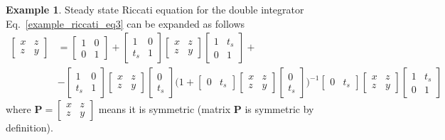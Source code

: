 \documentclass[11pt,a4paper,oneside]{book}
\numberwithin{equation}{section}
\theoremstyle{it}
\theoremstyle{definition}
\newtheorem{example}{Example}[chapter]
\begin{document}
\begin{example}{Steady state Riccati equation for the double integrator}
Eq.~\eqref{example_riccati_eq3} can be expanded as follows
\begin{equation}\label{example_riccati_eq4}
	\begin{aligned}
		\begin{bmatrix}x&z\\z&y\end{bmatrix} &=\begin{bmatrix}1&0\\0&1\end{bmatrix} + 
		\begin{bmatrix}1&0\\t_s&1\end{bmatrix}\begin{bmatrix}x&z\\z&y\end{bmatrix}\begin{bmatrix}1&t_s\\0&1\end{bmatrix}+ \\[6pt]
		&-\begin{bmatrix}1&0\\t_s&1\end{bmatrix}\begin{bmatrix}x&z\\z&y\end{bmatrix}\begin{bmatrix}0\\t_s\end{bmatrix}
		\Bigg(1+\begin{bmatrix}0&t_s\end{bmatrix}\begin{bmatrix}x&z\\z&y\end{bmatrix}\begin{bmatrix}0\\t_s\end{bmatrix}\Bigg)^{-1}\begin{bmatrix}0&t_s\end{bmatrix}\begin{bmatrix}x&z\\z&y\end{bmatrix}\begin{bmatrix}1&t_s\\0&1\end{bmatrix}
	\end{aligned}
\end{equation}
where $\mathbf{P}=\begin{bmatrix}x&z\\z&y\end{bmatrix}$ means it is symmetric 
(matrix $\mathbf{P}$ is symmetric by definition).


\end{example}
\end{document}
